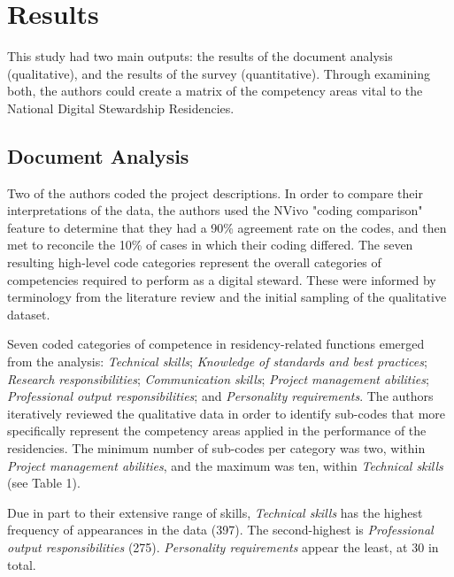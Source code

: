 \documentclass{acm_proc_article-sp}
\begin{document}
\section{Results}
This study had two main outputs: the results of the document analysis (qualitative), and the results of the survey (quantitative). Through examining both, the authors could create a matrix of the competency areas vital to the National Digital Stewardship Residencies.  

\subsection{Document Analysis}
Two of the authors coded the project descriptions. In order to compare their interpretations of the data, the authors used the NVivo "coding comparison" feature to determine that they had a 90\% agreement rate on the codes, and then met to reconcile the 10\% of cases in which their coding differed. The seven resulting high-level code categories represent the overall categories of competencies required to perform as a digital steward. These were informed by terminology from the literature review and the initial sampling of the qualitative dataset.

Seven coded categories of competence in residency-related functions emerged from the analysis: \textit{Technical skills}; \textit{Knowledge of standards and best practices}; \textit{Research responsibilities}; \textit{Communication skills}; \textit{Project management abilities}; \textit{Professional output responsibilities}; and \textit{Personality requirements}. The authors iteratively reviewed the qualitative data in order to identify sub-codes that more specifically represent the competency areas applied in the performance of the residencies. The minimum number of sub-codes per category was two, within \textit{Project management abilities}, and the maximum was ten, within \textit{Technical skills} (see Table 1). 

Due in part to their extensive range of skills, \textit{Technical skills} has the highest frequency of appearances in the data (397). The second-highest is \textit{Professional output responsibilities} (275). \textit{Personality requirements} appear the least, at 30 in total. 
\end{document}
